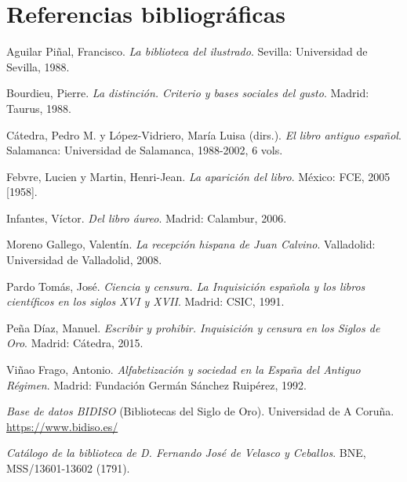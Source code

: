 \documentclass[12pt,a4paper]{article}
\begin{document}
\section*{Referencias bibliográficas}

\begin{enumerate}[label={[\arabic*]}, leftmargin=2cm]
\item Aguilar Piñal, Francisco. \textit{La biblioteca del ilustrado}. Sevilla: Universidad de Sevilla, 1988.

\item Bourdieu, Pierre. \textit{La distinción. Criterio y bases sociales del gusto}. Madrid: Taurus, 1988.

\item Cátedra, Pedro M. y López-Vidriero, María Luisa (dirs.). \textit{El libro antiguo español}. Salamanca: Universidad de Salamanca, 1988-2002, 6 vols.

\item Febvre, Lucien y Martin, Henri-Jean. \textit{La aparición del libro}. México: FCE, 2005 [1958].

\item Infantes, Víctor. \textit{Del libro áureo}. Madrid: Calambur, 2006.

\item Moreno Gallego, Valentín. \textit{La recepción hispana de Juan Calvino}. Valladolid: Universidad de Valladolid, 2008.

\item Pardo Tomás, José. \textit{Ciencia y censura. La Inquisición española y los libros científicos en los siglos XVI y XVII}. Madrid: CSIC, 1991.

\item Peña Díaz, Manuel. \textit{Escribir y prohibir. Inquisición y censura en los Siglos de Oro}. Madrid: Cátedra, 2015.

\item Viñao Frago, Antonio. \textit{Alfabetización y sociedad en la España del Antiguo Régimen}. Madrid: Fundación Germán Sánchez Ruipérez, 1992.

\item \textit{Base de datos BIDISO} (Bibliotecas del Siglo de Oro). Universidad de A Coruña. \url{https://www.bidiso.es/}

\item \textit{Catálogo de la biblioteca de D. Fernando José de Velasco y Ceballos}. BNE, MSS/13601-13602 (1791).
\end{enumerate}
\end{document}
